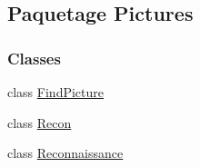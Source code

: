 \hypertarget{namespacePictures}{}\subsection{Paquetage Pictures}
\label{namespacePictures}
\subsubsection*{Classes}
\begin{DoxyCompactItemize}
\item 
class \hyperlink{classPictures_1_1FindPicture}{Find\+Picture}
\item 
class \hyperlink{classPictures_1_1Recon}{Recon}
\item 
class \hyperlink{classPictures_1_1Reconnaissance}{Reconnaissance}
\end{DoxyCompactItemize}
